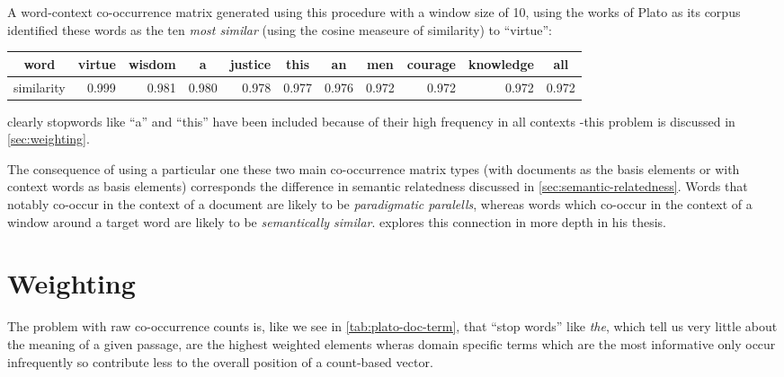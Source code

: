 \begin{example}
  A word-context co-occurrence matrix generated using this procedure with a window size of 10, using the works of Plato as its corpus identified these words as the ten \emph{most similar} (using the cosine measeure of similarity) to ``virtue'':
  \begin{center}{\footnotesize
      \captionsetup{width=.91\linewidth}
      \begin{tabular}{c r r r r r r r r r r}
        \toprule
        word & \multicolumn{1}{c}{virtue} & \multicolumn{1}{c}{wisdom} & \multicolumn{1}{c}{a} & \multicolumn{1}{c}{justice} & \multicolumn{1}{c}{this} & \multicolumn{1}{c}{an} & \multicolumn{1}{c}{men} & \multicolumn{1}{c}{courage} & \multicolumn{1}{c}{knowledge} & \multicolumn{1}{c}{all} \\
        \midrule
        similarity & 0.999 & 0.981 & 0.980 & 0.978 & 0.977 & 0.976 & 0.972 & 0.972 & 0.972 & 0.972 \\
        \bottomrule
      \end{tabular}
      \label{tab:plato-doc-term}
    }\end{center}
  clearly stopwords like ``a'' and ``this'' have been included because of their high frequency in all contexts -this problem is discussed in \autoref{sec:weighting}.
\end{example}

The consequence of using a particular one these two main co-occurrence matrix types (with documents as the basis elements or with context words as basis elements) corresponds the difference in semantic relatedness discussed in \autoref{sec:semantic-relatedness}. Words that notably co-occur in the context of a document are likely to be \emph{paradigmatic paralells}, whereas words which co-occur in the context of a window around a target word are likely to be \emph{semantically similar}. \textcite{sahlgreen-2006-the-word-space-model} explores this connection in more depth in his thesis.

\section{Weighting}\label{sec:weighting}
The problem with raw co-occurrence counts is, like we see in \autoref{tab:plato-doc-term}, that ``stop words'' like \emph{the}, which tell us very little about the meaning of a given passage, are the highest weighted elements wheras domain specific terms which are the most informative only occur infrequently so contribute less to the overall position of a count-based vector.

